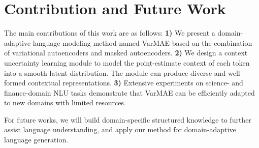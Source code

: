 \documentclass[11pt]{article}
\begin{document}
\section{Contribution and Future Work}
The main contributions of this work are as follows:
\textbf{1)} 
We present a domain-adaptive language modeling method named VarMAE based on the combination of variational autoencoders and masked autoencoders.
\textbf{2)} 
We design a context uncertainty learning module to model the point-estimate context of each token into a smooth latent distribution. 
The module can produce diverse and well-formed contextual representations. 
\textbf{3)}
Extensive experiments on science- and finance-domain NLU tasks demonstrate that VarMAE can be efficiently adapted to new domains with limited resources.

For future works, we will build domain-specific structured knowledge to further assist language understanding, and apply our method for domain-adaptive language generation.
\end{document}
